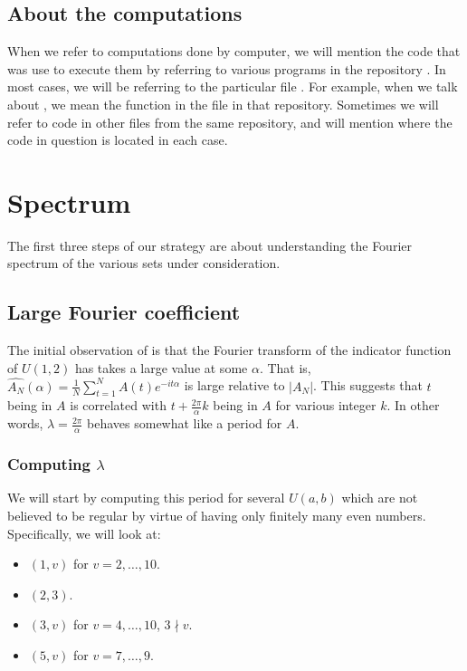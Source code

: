 \documentclass{report}
\theoremstyle{remark}
\numberwithin{equation}{section}
\begin{document}
\section{About the computations}

When we refer to computations done by computer, we will mention the
code that was use to execute them by referring to various programs in
the repository \cite{ross:gh2016}.  In most cases, we will be
referring to the particular file .  For
example, when we talk about , we mean the function
 in the  file in that
repository.  Sometimes we will refer to code in other files from the
same repository, and will mention where the code in question is
located in each case.

\chapter{Spectrum}

The first three steps of our strategy are about understanding the
Fourier spectrum of the various \relevant sets under consideration.

\section{Large Fourier coefficient}

The initial observation of \cite{steinerberger:preprint} is that the
Fourier transform of the indicator function of $U(1,2)$ has takes a
large value at some $\alpha$.  That is,
$\widehat{A_N}(\alpha) = \frac1N \sum_{t=1}^N A(t) e^{-it\alpha}$ is
large relative to $|A_N|$.  This suggests that $t$ being in $A$ is
correlated with $t+\frac{2\pi}{\alpha} k$ being in $A$ for various
integer $k$.  In other words, $\lambda = \frac{2\pi}{\alpha}$ behaves
somewhat like a period for $A$.

\subsection{Computing $\lambda$}

We will start by computing this period for several $U(a,b)$ which are
not believed to be regular by virtue of having only finitely many even
numbers.  Specifically, we will look at:

\begin{itemize}
\item $(1,v)$ for $v = 2, \ldots, 10$.
\item $(2,3)$.
\item $(3,v)$ for $v = 4, \ldots, 10$, $3 \nmid v$.
\item $(5,v)$ for $v = 7, \ldots, 9$.
\end{itemize}
\end{document}
